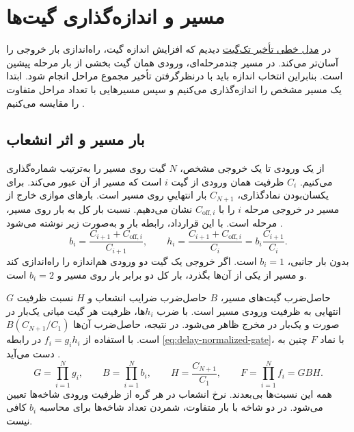 \section{ مسیر و اندازه‌گذاری گیت‌ها}
\label{sec:delay-path-model}

در \hyperref[sec:delay-linear-model]{مدل خطی تأخیر تک‌گیت} دیدیم
که افزایش اندازه گیت، راه‌اندازی بار خروجی را آسان‌تر می‌کند.
در مسیر چندمرحله‌ای، ورودی همان گیت بخشی از بار مرحله پیشین است.
بنابراین انتخاب اندازه باید با درنظرگرفتن تأخیر مجموع مراحل انجام
شود. ابتدا یک مسیر مشخص را اندازه‌گذاری می‌کنیم و سپس مسیرهایی
با تعداد مراحل متفاوت را مقایسه می‌کنیم
\cite[بخش ، صفحات ۱۶۳ تا ۱۷۳]{weste}
\cite[اسلایدهای ۱۳ تا ۲۷]{logicaleffortslides}.

\subsection{بار مسیر و اثر انشعاب}
\label{sec:delay-path-branching}

از یک ورودی تا یک خروجی مشخص، \(N\) گیت روی مسیر را به‌ترتیب
شماره‌گذاری می‌کنیم. \(C_i\) ظرفیت همان ورودی از گیت \(i\)
است که مسیر از آن عبور می‌کند. برای یکسان‌بودن نمادگذاری،
\(C_{N+1}\) بار انتهاییِ روی مسیر است. بارهای موازی خارج از
مسیر در خروجی مرحله \(i\) را با \(C_{\mathrm{off},i}\)
نشان می‌دهیم. نسبت بار کل به بار روی مسیر، 
مرحله است. با این قرارداد، رابطه بار و 
به‌صورت زیر نوشته می‌شود
\cite[روابط  تا ، صفحه ۱۶۴]{weste}
\cite[اسلایدهای ۱۳ تا ۱۶]{logicaleffortslides}.
\begin{equation}
  b_i=\frac{C_{i+1}+C_{\mathrm{off},i}}{C_{i+1}},
  \qquad
  h_i=\frac{C_{i+1}+C_{\mathrm{off},i}}{C_i}
     =b_i\frac{C_{i+1}}{C_i}.
  \label{eq:delay-path-branching}
\end{equation}
بدون بار جانبی، \(b_i=1\) است. اگر خروجی یک گیت دو ورودی
هم‌اندازه را راه‌اندازی کند و مسیر از یکی از آن‌ها بگذرد،
بار کل دو برابر بار روی مسیر و \(b_i=2\) است.

\(G\) حاصل‌ضرب  گیت‌های مسیر،
\(B\) حاصل‌ضرب ضرایب انشعاب و \(H\) نسبت ظرفیت انتهایی
به ظرفیت ورودی مسیر است. با ضرب \(h_i\)ها، ظرفیت هر گیت
میانی یک‌بار در صورت و یک‌بار در مخرج ظاهر می‌شود. در نتیجه،
حاصل‌ضرب آن‌ها \(B(C_{N+1}/C_1)\) است. با استفاده از
\(f_i=g_i h_i\) در رابطه \eqref{eq:delay-normalized-gate}،
 با نماد \(F\) چنین به دست می‌آید
\cite[روابط  تا ، صفحه ۱۶۴]{weste}.
\begin{equation}
  G=\prod_{i=1}^{N}g_i,\qquad
  B=\prod_{i=1}^{N}b_i,\qquad
  H=\frac{C_{N+1}}{C_1},\qquad
  F=\prod_{i=1}^{N}f_i=GBH.
  \label{eq:delay-path-effort}
\end{equation}
همه این نسبت‌ها بی‌بعدند. نرخ انشعاب در هر گره از ظرفیت
ورودی شاخه‌ها تعیین می‌شود. در دو شاخه با بار متفاوت،
شمردن تعداد شاخه‌ها برای محاسبه \(b_i\) کافی نیست.

